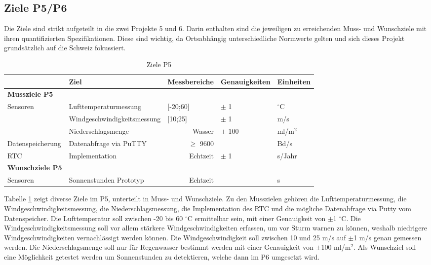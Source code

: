 \begin{landscape}
\section{Ziele P5/P6}
Die Ziele sind strikt aufgeteilt in die zwei Projekte 5 und 6. Darin enthalten sind die jeweiligen zu erreichenden Muss- und Wunschziele mit ihren quantifizierten Spezifikationen. Diese sind wichtig, da Ortsabhängig unterschiedliche Normwerte gelten und sich dieses Projekt grundsätzlich auf die Schweiz fokussiert.\\
\begin{table}[htbp]
  \centering
  \caption{Ziele P5}
    \begin{tabular}{r|l|r|l|l}
          & \textbf{Ziel} & \multicolumn{1}{l|}{\textbf{Messbereiche}} & \textbf{Genauigkeiten} & \textbf{Einheiten} \\
    \toprule
    \multicolumn{1}{l}{\textbf{Mussziele P5}} & \multicolumn{1}{r}{} & \multicolumn{1}{r}{} & \multicolumn{1}{r}{} &  \\
    \toprule
    \multicolumn{1}{l|}{Sensoren} & Lufttemperaturmessung & \multicolumn{1}{l|}{[-20;60]} & $\pm$ 1 & $^\circ$C \\
\cline{2-5}          & Windgeschwindigkeitsmessung & \multicolumn{1}{l|}{[10;25]} & $\pm$ 1   & m/s \\
\cline{2-5} & Niederschlagsmenge &   Wasser    & $\pm$ 100 & ml/m$^2$ \\
    \hline
    \multicolumn{1}{l|}{Datenspeicherung} & Datenabfrage via PuTTY &   $\geq$ 9600    &       &  Bd/s\\
    \hline
    \multicolumn{1}{l|}{RTC} & Implementation &   Echtzeit    & $\pm$ 1   & s/Jahr \\
\bottomrule
\multicolumn{1}{l}{\textbf{Wunschziele P5}} & \multicolumn{1}{l}{} & \multicolumn{1}{l}{} & \multicolumn{1}{l}{} &  \\
    \toprule
    \multicolumn{1}{l|}{Sensoren} & Sonnenstunden Prototyp &   Echtzeit    &       & s \\
    \bottomrule
    \end{tabular}%
  \label{tab:ZieleP5}%
\end{table}%

Tabelle \ref{tab:ZieleP5} zeigt diverse Ziele im P5, unterteilt in Muss- und Wunschziele. Zu den Musszielen gehören die Lufttemperaturmessung, die Windgeschwindigkeitsmessung, die Niederschlagsmessung, die Implementation des RTC und die mögliche Datenabfrage via Putty vom Datenspeicher. Die Lufttemperatur soll zwischen -20 bis 60 $^\circ$C ermittelbar sein, mit einer Genauigkeit von $\pm$1 $^\circ$C. Die Windgeschwindigkeitsmessung soll vor allem stärkere Windgeschwindigkeiten erfassen, um vor Sturm warnen zu können, weshalb niedrigere Windgeschwindigkeiten vernachlässigt werden können. Die Windgeschwindigkeit soll zwischen 10 und 25 m/s auf $\pm$1 m/s genau gemessen werden. Die Niederschlagsmenge soll nur für Regenwasser bestimmt werden mit einer Genauigkeit von $\pm$100 ml/m$^2$. Als Wunschziel soll eine Möglichkeit getestet werden um Sonnenstunden zu detektieren, welche dann im P6 umgesetzt wird.\\


\end{landscape}

